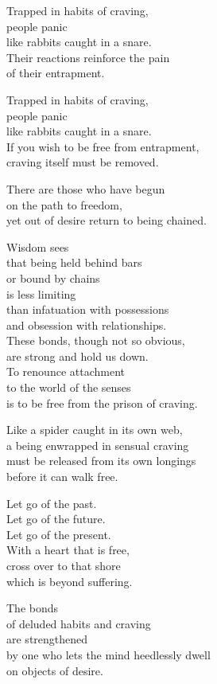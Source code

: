 Trapped in habits of craving,\\
people panic\\
like rabbits caught in a snare.\\
Their reactions reinforce the pain\\
of their entrapment.


Trapped in habits of craving,\\
people panic\\
like rabbits caught in a snare.\\
If you wish to be free from entrapment,\\
craving itself must be removed.


There are those who have begun\\
on the path to freedom,\\
yet out of desire return to being chained.


Wisdom sees\\
that being held behind bars\\
or bound by chains\\
is less limiting\\
than infatuation with possessions\\
and obsession with relationships.\\
These bonds, though not so obvious,\\
are strong and hold us down.\\
To renounce attachment\\
to the world of the senses\\
is to be free from the prison of craving.


Like a spider caught in its own web,\\
a being enwrapped in sensual craving\\
must be released from its own longings\\
before it can walk free.


Let go of the past.\\
Let go of the future.\\
Let go of the present.\\
With a heart that is free,\\
cross over to that shore\\
which is beyond suffering.


The bonds\\
of deluded habits and craving\\
are strengthened\\
by one who lets the mind heedlessly dwell\\
on objects of desire.


